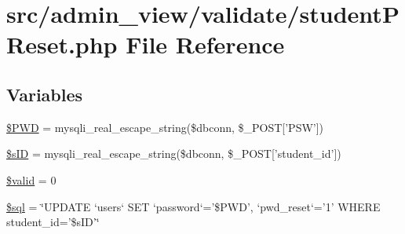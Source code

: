\hypertarget{studentPReset_8php}{\section{src/admin\-\_\-view/validate/student\-P\-Reset.php \-File \-Reference}
\label{studentPReset_8php}
}
\subsection*{\-Variables}
\begin{DoxyCompactItemize}
\item 
\hyperlink{studentPReset_8php_ad10f6388800bdf18e795c1afd61faab1}{\$\-P\-W\-D} = mysqli\-\_\-real\-\_\-escape\-\_\-string(\$dbconn, \$\-\_\-\-P\-O\-S\-T\mbox{[}'\-P\-S\-W'\mbox{]})
\item 
\hyperlink{studentPReset_8php_a71c1c0263d3e18eab2e45b17e450b2dd}{\$s\-I\-D} = mysqli\-\_\-real\-\_\-escape\-\_\-string(\$dbconn, \$\-\_\-\-P\-O\-S\-T\mbox{[}'student\-\_\-id'\mbox{]})
\item 
\hyperlink{studentPReset_8php_a0587674d27d00ef497e08e53ccf45bbb}{\$valid} = 0
\item 
\hyperlink{studentPReset_8php_a047170d6020a882807665812a27e2525}{\$sql} = \char`\"{}\-U\-P\-D\-A\-T\-E `users` \-S\-E\-T `password`='\$\-P\-W\-D', `pwd\-\_\-reset`='1' \-W\-H\-E\-R\-E student\-\_\-id='\$s\-I\-D'\char`\"{}
\end{DoxyCompactItemize}


